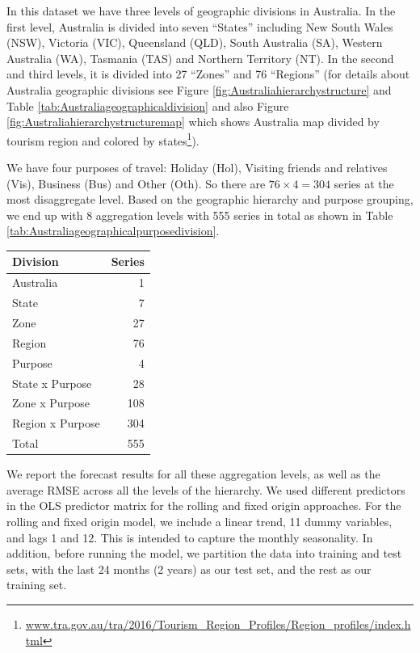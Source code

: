 \documentclass[11pt,a4paper,]{article}
\let\origtable\table
\let\endorigtable\endtable
\renewenvironment{table}[1][2] {
    \expandafter\origtable\expandafter[!htbp]
} {
    \endorigtable
}
\begin{document}
In this dataset we have three levels of geographic divisions in Australia. In the first level, Australia is divided into seven ``States'' including New South Wales (NSW), Victoria (VIC), Queensland (QLD), South Australia (SA), Western Australia (WA), Tasmania (TAS) and Northern Territory (NT). In the second and third levels, it is divided into 27 ``Zones'' and 76 ``Regions'' (for details about Australia geographic divisions see Figure \ref{fig:Australiahierarchystructure} and Table \ref{tab:Australiageographicaldivision} and also Figure \ref{fig:Australiahierarchystructuremap} which shows Australia map divided by tourism region and colored by states\footnote{\url{www.tra.gov.au/tra/2016/Tourism_Region_Profiles/Region_profiles/index.html}}).

We have four purposes of travel: Holiday (Hol), Visiting friends and relatives (Vis), Business (Bus) and Other (Oth). So there are \(76\times4 = 304\) series at the most disaggregate level. Based on the geographic hierarchy and purpose grouping, we end up with 8 aggregation levels with 555 series in total as shown in Table \ref{tab:Australiageographicalpurposedivision}.

\begin{table}[!h]

\caption{\label{tab:Australiageographicalpurposedivision}Number of Australian domestic tourism series at each aggregation level.}
\centering
\begin{tabular}[t]{lr}
\toprule
Division & Series\\
\midrule
Australia & 1\\
State & 7\\
Zone & 27\\
Region & 76\\
Purpose & 4\\
State x Purpose & 28\\
Zone x Purpose & 108\\
Region x Purpose & 304\\
\hline
Total & 555\\
\bottomrule
\end{tabular}
\end{table}

We report the forecast results for all these aggregation levels, as well as the average RMSE across all the levels of the hierarchy. We used different predictors in the OLS predictor
matrix for the rolling and fixed origin approaches. For the rolling and fixed origin model, we include a linear trend, 11 dummy variables, and lags 1 and 12. This is intended to capture the monthly seasonality. In addition, before running the model, we partition the data into training and test sets, with the last 24 months (2 years) as our test set, and the rest as our training set.
\end{document}
